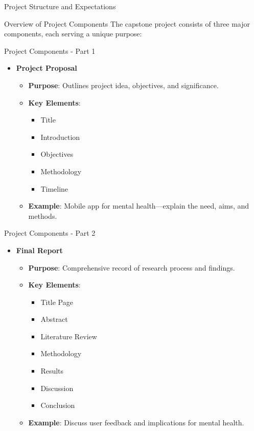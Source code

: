 \documentclass[aspectratio=169]{beamer}
\begin{document}
\begin{frame}[fragile]{Project Structure and Expectations}
    \begin{block}{Overview of Project Components}
        The capstone project consists of three major components, each serving a unique purpose:
    \end{block}
\end{frame}

\begin{frame}[fragile]{Project Components - Part 1}
    \begin{itemize}
        \item \textbf{Project Proposal}
        \begin{itemize}
            \item \textbf{Purpose}: Outlines project idea, objectives, and significance.
            \item \textbf{Key Elements}:
            \begin{itemize}
                \item Title
                \item Introduction
                \item Objectives
                \item Methodology
                \item Timeline
            \end{itemize}
            \item \textbf{Example}: Mobile app for mental health—explain the need, aims, and methods.
        \end{itemize}
    \end{itemize}
\end{frame}

\begin{frame}[fragile]{Project Components - Part 2}
    \begin{itemize}
        \item \textbf{Final Report}
        \begin{itemize}
            \item \textbf{Purpose}: Comprehensive record of research process and findings.
            \item \textbf{Key Elements}:
            \begin{itemize}
                \item Title Page
                \item Abstract
                \item Literature Review
                \item Methodology
                \item Results
                \item Discussion
                \item Conclusion
            \end{itemize}
            \item \textbf{Example}: Discuss user feedback and implications for mental health.
        \end{itemize}
    \end{itemize}
\end{frame}
\end{document}
